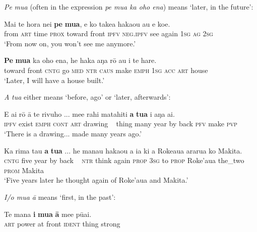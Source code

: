  
\textit{Pe} \textit{mu{\ꞌ}a} (often in the expression \textit{pe mu{\ꞌ}a ka oho ena}) means ‘later, in the future’:

\ea\label{ex:3.153}
\gll Mai te hora nei \textbf{pe} \textbf{mu{\ꞌ}a}, e ko take{\ꞌ}a haka{\ꞌ}ou au e koe. \\
from \textsc{art} time \textsc{prox} toward front \textsc{ipfv} \textsc{neg.ipfv} see again \textsc{1sg} \textsc{ag} \textsc{2sg} \\

\glt 
‘From now on, you won’t see me anymore.’ \textstyleExampleref{[R309.070]} 
\z

\ea\label{ex:3.154}
\gll \textbf{Pe} \textbf{mu{\ꞌ}a} ka oho ena, he haka aŋa rō au i te hare.      \\
toward front \textsc{cntg} go \textsc{med} \textsc{ntr} \textsc{caus} make \textsc{emph} \textsc{1sg} \textsc{acc} \textsc{art} house      \\

\glt 
‘Later, I will have a house built.’ \textstyleExampleref{[R229.029]} 
\z

\textit{A} \textit{tu{\ꞌ}a} either means ‘before, ago’ or ‘later, afterwards’:

\ea\label{ex:3.155}
\gll E ai rō {\ꞌ}ā te rivuho ... me{\ꞌ}e rahi matahiti \textbf{a} \textbf{tu{\ꞌ}a} i aŋa ai. \\
\textsc{ipfv} exist \textsc{emph} \textsc{cont} \textsc{art} drawing ~ thing many year by back \textsc{pfv} make \textsc{pvp} \\

\glt 
‘There is a drawing... made many years ago.’ \textstyleExampleref{[R296.010–013]}
\z

\ea\label{ex:3.156}
\gll Ka rima ta{\ꞌ}u \textbf{a} \textbf{tu{\ꞌ}a} ... he mana{\ꞌ}u haka{\ꞌ}ou a ia ki a Roke{\ꞌ}aua ararua ko Makita.\\
\textsc{cntg} five year by back ~ \textsc{ntr} think again \textsc{prop} \textsc{3sg} to \textsc{prop} Roke’aua the\_two \textsc{prom} Makita\\

\glt 
‘Five years later he thought again of Roke’aua and Makita.’ \textstyleExampleref{[R243.205]} 
\z

\textit{{\ꞌ}I/o mu{\ꞌ}a {\ꞌ}ā} means ‘first, in the past’:

\ea\label{ex:3.157}
\gll Te mana \textbf{{\ꞌ}i} \textbf{mu{\ꞌ}a} \textbf{{\ꞌ}ā} me{\ꞌ}e pūai. \\
\textsc{art} power at front \textsc{ident} thing strong \\

